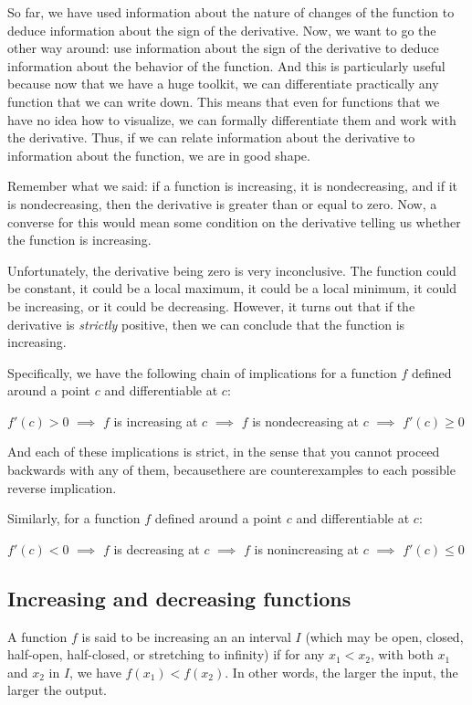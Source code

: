 \documentclass{amsart}
\begin{document}
So far, we have used information about the nature of changes of the
function to deduce information about the sign of the derivative. Now,
we want to go the other way around: use information about the sign of
the derivative to deduce information about the behavior of the
function. And this is particularly useful because now that we have a
huge toolkit, we can differentiate practically any function that we
can write down. This means that even for functions that we have no
idea how to visualize, we can formally differentiate them and work
with the derivative. Thus, if we can relate information about the
derivative to information about the function, we are in good shape.

Remember what we said: if a function is increasing, it is
nondecreasing, and if it is nondecreasing, then the derivative is
greater than or equal to zero. Now, a converse for this would mean
some condition on the derivative telling us whether the function is
increasing.

Unfortunately, the derivative being zero is very inconclusive. The
function could be constant, it could be a local maximum, it could be a
local minimum, it could be increasing, or it could be
decreasing. However, it turns out that if the derivative is {\em
strictly} positive, then we can conclude that the function is
increasing.

Specifically, we have the following chain of implications for a
function $f$ defined around a point $c$ and differentiable at $c$:

$f'(c) > 0$ $\implies$ $f$ is increasing at $c$ $\implies$ $f$ is
nondecreasing at $c$ $\implies$ $f'(c) \ge 0$

And each of these implications is strict, in the sense that you cannot
proceed backwards with any of them, becausethere are counterexamples
to each possible reverse implication.

Similarly, for a function $f$ defined around a point $c$ and
differentiable at $c$: 

$f'(c) < 0$ $\implies$ $f$ is decreasing at $c$ $\implies$ $f$ is
nonincreasing at $c$ $\implies$ $f'(c) \le 0$

\subsection{Increasing and decreasing functions}

A function $f$ is said to be increasing an an interval $I$ (which may
be open, closed, half-open, half-closed, or stretching to infinity) if
for any $x_1 < x_2$, with both $x_1$ and $x_2$ in $I$, we have $f(x_1)
< f(x_2)$. In other words, the larger the input, the larger the output.
\end{document}
